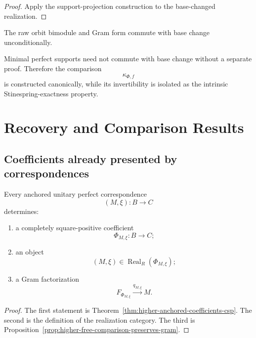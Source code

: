 \begin{proof}
Apply the support-projection construction to the base-changed realization.
\end{proof}

\begin{remark}
\label{rem:higher-no-universal-base-change-exactness}
The raw orbit bimodule and Gram form commute with base change
unconditionally.

Minimal perfect supports need not commute with base change without a separate
proof. Therefore the comparison
\[
  \kappa_{\Phi,f}
\]
is constructed canonically, while its invertibility is isolated as the
intrinsic Stinespring-exactness property.
\end{remark}

\section{Recovery and Comparison Results}
\label{sec:higher-stinespring-recovery}

\subsection{Coefficients already presented by correspondences}

\begin{proposition}
\label{prop:higher-represented-coefficients}
Every anchored unitary perfect correspondence
\[
  (M,\xi):B\to C
\]
determines:

\begin{enumerate}
  \item a completely square-positive coefficient
  \[
    \Phi_{M,\xi}:B\to C;
  \]

  \item an object
  \[
    (M,\xi)
    \in
    \operatorname{Real}_R(\Phi_{M,\xi});
  \]

  \item a Gram factorization
  \[
    F_{\Phi_{M,\xi}}
    \xrightarrow{q_{M,\xi}}
    M.
  \]
\end{enumerate}
\end{proposition}

\begin{proof}
The first statement is
Theorem~\ref{thm:higher-anchored-coefficients-csp}. The second is the
definition of the realization category. The third is
Proposition~\ref{prop:higher-free-comparison-preserves-gram}.
\end{proof}


